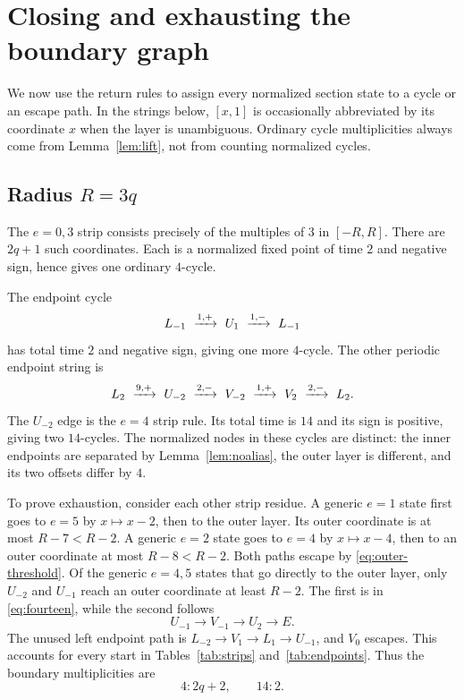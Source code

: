 \section{Closing and exhausting the boundary graph}\label{sec:closure}

We now use the return rules to assign every normalized section state
to a cycle or an escape path. In the strings below, $[x,1]$ is
occasionally abbreviated by its coordinate $x$ when the layer is
unambiguous. Ordinary cycle multiplicities always come from
Lemma~\ref{lem:lift}, not from counting normalized cycles.

\subsection{Radius \texorpdfstring{\(R=3q\)}{R=3q}}

The $e=0,3$ strip consists precisely of the multiples of $3$
in $[-R,R]$. There are $2q+1$ such coordinates. Each is a
normalized fixed point of time $2$ and negative sign, hence gives
one ordinary $4$-cycle.

The endpoint cycle
\[
 L_{-1}\ \xto{1,+}\ U_1\ \xto{1,-}\ L_{-1}
\]
has total time $2$ and negative sign, giving one more $4$-cycle.
The other periodic endpoint string is
\begin{equation}\label{eq:fourteen}
 L_2\ \xrightarrow{9,+}\ U_{-2}\ \xrightarrow{2,-}\ V_{-2}
 \ \xrightarrow{1,+}\ V_2\ \xrightarrow{2,-}\ L_2.
\end{equation}
The $U_{-2}$ edge is the $e=4$ strip rule. Its total time is
$14$ and its sign is positive, giving two $14$-cycles.
The normalized nodes in these cycles are distinct: the inner
endpoints are separated by Lemma~\ref{lem:noalias}, the outer
layer is different, and its two offsets differ by $4$.

To prove exhaustion, consider each other strip residue. A generic
$e=1$ state first goes to $e=5$ by $x\mapsto x-2$, then to
the outer layer. Its outer coordinate is at most $R-7<R-2$.
A generic $e=2$ state goes to $e=4$ by $x\mapsto x-4$,
then to an outer coordinate at most $R-8<R-2$.
Both paths escape by \eqref{eq:outer-threshold}.
Of the generic $e=4,5$ states that go directly to the outer
layer, only $U_{-2}$ and $U_{-1}$ reach an outer coordinate
at least $R-2$. The first is in \eqref{eq:fourteen}, while
the second follows
\[
 U_{-1}\longrightarrow V_{-1}\longrightarrow U_2\longrightarrow E.
\]
The unused left endpoint path is
$L_{-2}\to V_1\to L_1\to U_{-1}$, and $V_0$ escapes.
This accounts for every start in Tables~\ref{tab:strips}
and~\ref{tab:endpoints}. Thus the boundary multiplicities are
\[
 4:2q+2,\qquad 14:2.
\]

